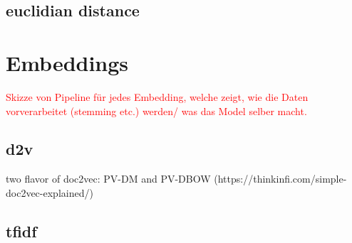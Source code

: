 \subsection{euclidian distance}\label{subsec:euclidian-distance}





\section{Embeddings}\label{sec:embeddings}

\cite{WordRep2013}
\cite{SentRep2014}

\textcolor{red}{Skizze von Pipeline für jedes Embedding, welche zeigt, wie die Daten vorverarbeitet (stemming etc.) werden/ was das Model selber macht.}


\subsection{\ac{d2v}}\label{subsec:doc2vec}
\cite{SentRep2014}
two flavor of doc2vec: PV-DM and PV-DBOW (https://thinkinfi.com/simple-doc2vec-explained/)
\cite{SkipGram2013}


\subsection{\ac{tfidf}}\label{subsec:tfidf}

